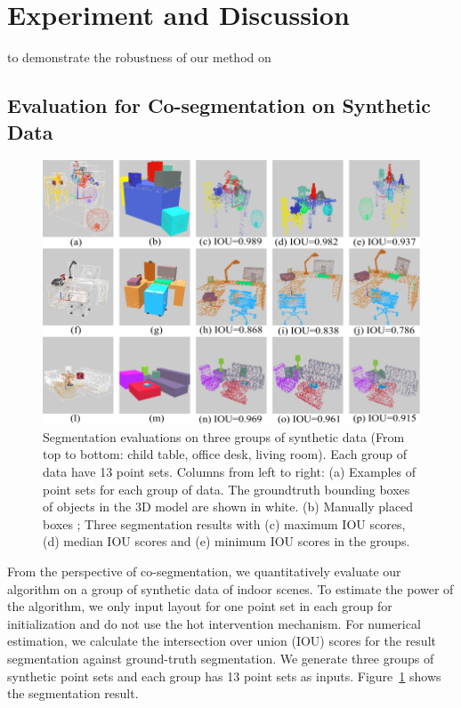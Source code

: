 \section{Experiment and Discussion}

  to demonstrate the robustness of our method on 



\subsection{Evaluation for Co-segmentation on Synthetic Data}
\begin{figure}[htb]
	\centering
	\includegraphics[width=0.8\linewidth]{images/seg/seg}
	\caption{\label{fig:seg} Segmentation evaluations on three groups of synthetic data (From top to bottom: child table, office desk, living room). Each group of data have 13 point sets. Columns from left to right: (a) Examples of point sets for each group of data. The groundtruth bounding boxes of objects in the 3D model are shown in white. (b) Manually placed boxes ; Three segmentation results with (c) maximum IOU scores, (d) median IOU scores and (e) minimum IOU scores in the groups.}
\end{figure}


From the perspective of co-segmentation, we quantitatively evaluate our algorithm on a group of synthetic data of indoor scenes. 
%
To estimate the power of the algorithm, we only input layout for one point set in each group for initialization and do not use the hot intervention mechanism. 
%
For numerical estimation, we calculate the intersection over union (IOU) scores for the result segmentation against ground-truth segmentation. 
We generate three groups of synthetic point sets and each group has 13 point sets as inputs. 
Figure~\ref{fig:seg} shows the segmentation result.


